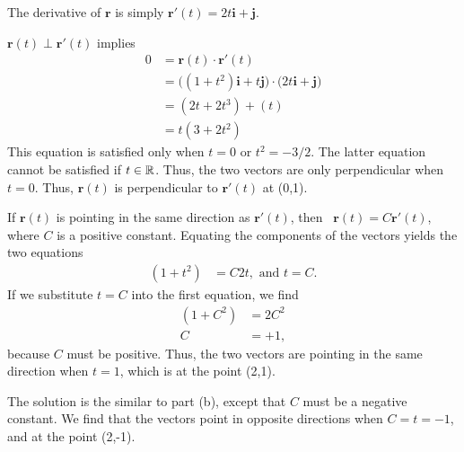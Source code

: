 \item The derivative of $\textbf{r}$ is simply
\(
  \mathbf{r}'(t) = 2t \mathbf{i} + \mathbf{j}.
\)

\BEN
\item \(
  \mathbf{r}(t) \perp  \mathbf{r}'(t)
\)
implies
\begin{align*}
  0& = \mathbf{r}(t) \cdot  \mathbf{r}'(t) \\
  &= \big((1+t^2) \mathbf{i} + t\mathbf{j} \big) \cdot \big(2t \mathbf{i} + \mathbf{j}\big) \\
  &= (2t+2t^3) + (t)\\
  &= t(3+2t^2)
\end{align*}
This equation is satisfied only when $t=0$ or $t^2 = -3/2$. The latter equation cannot be satisfied if $t\in\mathbb{R}$. Thus, the two vectors are only perpendicular when $t=0$. Thus,  \(\mathbf{r}(t)\) is perpendicular to \(\mathbf{r}'(t)\) at (0,1). 
\item If \(\mathbf{r}(t)\) is pointing in the same direction as \(\mathbf{r}'(t)\), then \ \(\mathbf{r}(t) = C  \mathbf{r}'(t)\), where $C$ is a positive constant. Equating the components of the vectors yields the two equations
\begin{align*}
  (1+t^2)& = C2t , \text{ and } t=C.
\end{align*}
If we substitute $t=C$ into the first equation, we find
\begin{align*}
  (1+C^2)& = 2C^2\\
  C&=+1,
\end{align*}
because $C$ must be positive. Thus, the two vectors are pointing in the same direction when $t=1$, which is at the point (2,1).
\item
The solution is the similar to part (b), except that $C$ must be a negative constant. We find that the vectors point in opposite directions when $C=t=-1$, and at the point (2,-1).
\EEN

